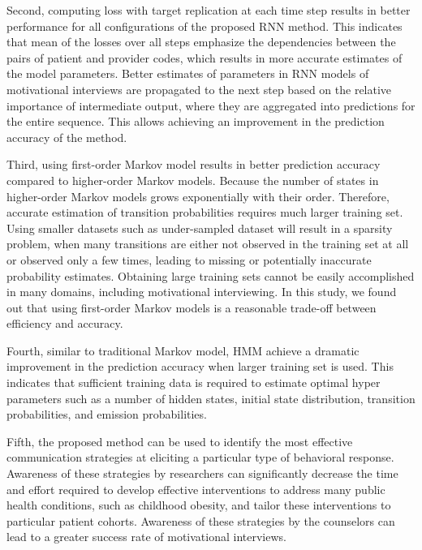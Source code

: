 \documentclass{amia_summit_2018}
\begin{document}
Second, computing loss with target replication at each time step results in better performance for all configurations of the proposed RNN method. This indicates that mean of the losses over all steps emphasize the dependencies between the pairs of patient and provider codes, which results in more accurate estimates of the model parameters. Better estimates of parameters in RNN models of motivational interviews are propagated to the next step based on the relative importance of intermediate output, where they are aggregated into predictions for the entire sequence. This allows achieving an improvement in the prediction accuracy of the method. 

Third, using first-order Markov model results in better prediction accuracy compared to higher-order Markov models. Because the number of states in higher-order Markov models grows exponentially with their order. Therefore, accurate estimation of transition probabilities requires much larger training set. Using smaller datasets such as under-sampled dataset will result in a sparsity problem, when many transitions are either not observed in the training set at all or observed only a few times, leading to missing or potentially inaccurate probability estimates. Obtaining large training sets cannot be easily accomplished in many domains, including motivational interviewing. In this study, we found out that using first-order Markov models is a reasonable trade-off between efficiency and accuracy.  

Fourth, similar to traditional Markov model, HMM achieve a dramatic improvement in the prediction accuracy when larger training set is used. This indicates that sufficient training data is required to estimate optimal hyper parameters such as a number of hidden states, initial state distribution, transition probabilities, and emission probabilities.   
 
Fifth, the proposed method can be used to identify the most effective communication strategies at eliciting a particular type of behavioral response. Awareness of these strategies by researchers can significantly decrease the time and effort required to develop effective interventions to address many public health conditions, such as childhood obesity, and tailor these interventions to particular patient cohorts. Awareness of these strategies by the counselors can lead to a greater success rate of motivational interviews.     
 
\end{document}
